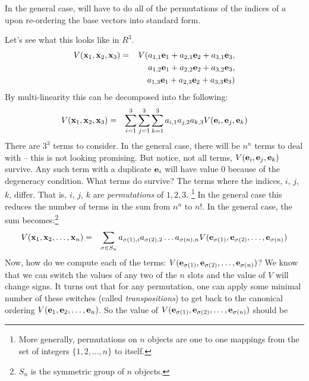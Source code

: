 \documentclass{article}
\begin{document}
In the general case, will have to do all of the permutations of the indices of $a$
upon re-ordering the base vectors into standard form.

Let's see what this looks like in $R^3$.
\begin{eqnarray}
  V({\bf x}_1, {\bf x}_2, {\bf x}_3)
  & = & V(a_{1,1} {\bf e}_1 + a_{2,1} {\bf e}_2 + a_{3,1} {\bf e}_3, \nonumber \\
  & & \hphantom{V(}a_{1,2} {\bf e}_1 + a_{2,2} {\bf e}_2 + a_{3,2} {\bf e}_3, \nonumber \\
  & & \hphantom{V(}a_{1,3} {\bf e}_1 + a_{2,3} {\bf e}_2 + a_{3,3} {\bf e}_3)
\end{eqnarray}
By multi-linearity this can be decomposed into the following:
\begin{eqnarray}
  V({\bf x}_1, {\bf x}_2, {\bf x}_3)
  & = & \sum_{i=1}^3\sum_{j=1}^3 \sum_{k=1}^3 a_{i,1} a_{j,2} a_{k,3}
        V({\bf e}_{i}, {\bf e}_{j}, {\bf e}_{k})
\end{eqnarray}
There are $3^3$ terms to consider. In the general case, there will be $n^n$ terms to
deal with -- this is not looking promising. But notice, not all terms,
$V({\bf e}_{i}, {\bf e}_{j}, {\bf e}_{k})$ survive. Any such term with
a duplicate ${\bf e}_i$ will have value $0$ because of the degeneracy condition.
What terms do survive? The terms
where the indices, $i$, $j$, $k$, differ. That is, $i$, $j$, $k$ are
{\em permutations\/}
of $1, 2, 3$.%
\footnote{More generally, permutations on $n$ objects are one to one
  mappings from the set of integers $\{1, 2, \ldots, n\}$ to itself.}
In the general case this reduces
the number of terms in the sum from $n^n$ to $n!$. In the general case, the
sum becomes:\footnote{$S_n$ is the symmetric group of $n$ objects.}
\begin{eqnarray}
  V({\bf x}_1, {\bf x}_2, \ldots, {\bf x}_n)
  & = & \sum_{\sigma \in S_n} a_{\sigma(1), i} a_{\sigma(2),2} \ldots a_{\sigma(n), n}
        V({\bf e}_{\sigma(1)}, {\bf e}_{\sigma(2)}, \ldots, {\bf e}_{\sigma(n)})
\end{eqnarray}
Now, how do we compute each of the terms:
$V({\bf e}_{\sigma(1)}, {\bf e}_{\sigma(2)}, \ldots, {\bf e}_{\sigma(n)})$?
We know that we can switch the values of any two of the $n$ slots and the
value of $V$ will change signs. It turns out that for any permutation, one can
apply some minimal number of these switches (called {\em transpositions\/})
to get back to the canonical
ordering $V({\bf e}_1, {\bf e}_2, \ldots, {\bf e}_n)$. So the value of
$V({\bf e}_{\sigma(1)}, {\bf e}_{\sigma(2)}, \ldots, {\bf e}_{\sigma(n)})$ should be
\end{document}
